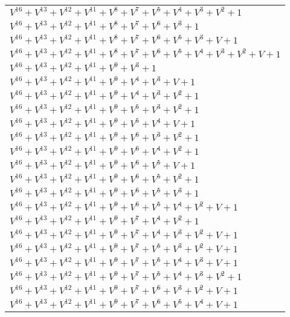 \documentclass[12pt]{article}
\begin{document}
\begin{adjustwidth}{-4cm}{}
\begin{center}
\begin{longtable}{|l|}
$V^{16}  +V^{13}  +V^{12}  +V^{11}  +V^{8}  +V^{7}  +V^{5}  +V^{4}  +V^{3}  +V^{2}  + 1$ \\
$V^{16}  +V^{13}  +V^{12}  +V^{11}  +V^{8}  +V^{7}  +V^{6}  +V^{3}  + 1$ \\
$V^{16}  +V^{13}  +V^{12}  +V^{11}  +V^{8}  +V^{7}  +V^{6}  +V^{5}  +V^{3}  + V + 1$ \\
$V^{16}  +V^{13}  +V^{12}  +V^{11}  +V^{8}  +V^{7}  +V^{6}  +V^{5}  +V^{4}  +V^{3}  +V^{2}  + V + 1$ \\
$V^{16}  +V^{13}  +V^{12}  +V^{11}  +V^{9}  +V^{3}  + 1$ \\
$V^{16}  +V^{13}  +V^{12}  +V^{11}  +V^{9}  +V^{4}  +V^{3}  + V + 1$ \\
$V^{16}  +V^{13}  +V^{12}  +V^{11}  +V^{9}  +V^{4}  +V^{3}  +V^{2}  + 1$ \\
$V^{16}  +V^{13}  +V^{12}  +V^{11}  +V^{9}  +V^{5}  +V^{3}  +V^{2}  + 1$ \\
$V^{16}  +V^{13}  +V^{12}  +V^{11}  +V^{9}  +V^{5}  +V^{4}  + V + 1$ \\
$V^{16}  +V^{13}  +V^{12}  +V^{11}  +V^{9}  +V^{6}  +V^{3}  +V^{2}  + 1$ \\
$V^{16}  +V^{13}  +V^{12}  +V^{11}  +V^{9}  +V^{6}  +V^{4}  +V^{2}  + 1$ \\
$V^{16}  +V^{13}  +V^{12}  +V^{11}  +V^{9}  +V^{6}  +V^{5}  + V + 1$ \\
$V^{16}  +V^{13}  +V^{12}  +V^{11}  +V^{9}  +V^{6}  +V^{5}  +V^{2}  + 1$ \\
$V^{16}  +V^{13}  +V^{12}  +V^{11}  +V^{9}  +V^{6}  +V^{5}  +V^{3}  + 1$ \\
$V^{16}  +V^{13}  +V^{12}  +V^{11}  +V^{9}  +V^{6}  +V^{5}  +V^{4}  +V^{2}  + V + 1$ \\
$V^{16}  +V^{13}  +V^{12}  +V^{11}  +V^{9}  +V^{7}  +V^{4}  +V^{2}  + 1$ \\
$V^{16}  +V^{13}  +V^{12}  +V^{11}  +V^{9}  +V^{7}  +V^{4}  +V^{3}  +V^{2}  + V + 1$ \\
$V^{16}  +V^{13}  +V^{12}  +V^{11}  +V^{9}  +V^{7}  +V^{5}  +V^{3}  +V^{2}  + V + 1$ \\
$V^{16}  +V^{13}  +V^{12}  +V^{11}  +V^{9}  +V^{7}  +V^{5}  +V^{4}  +V^{3}  + V + 1$ \\
$V^{16}  +V^{13}  +V^{12}  +V^{11}  +V^{9}  +V^{7}  +V^{5}  +V^{4}  +V^{3}  +V^{2}  + 1$ \\
$V^{16}  +V^{13}  +V^{12}  +V^{11}  +V^{9}  +V^{7}  +V^{6}  +V^{3}  +V^{2}  + V + 1$ \\
$V^{16}  +V^{13}  +V^{12}  +V^{11}  +V^{9}  +V^{7}  +V^{6}  +V^{5}  +V^{4}  + V + 1$ \\

\end{longtable}
\end{center}
\end{adjustwidth}
\end{document}
